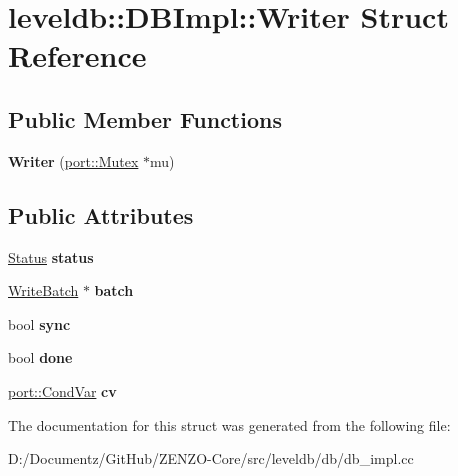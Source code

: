 \hypertarget{structleveldb_1_1_d_b_impl_1_1_writer}{}\section{leveldb\+::D\+B\+Impl\+::Writer Struct Reference}
\label{structleveldb_1_1_d_b_impl_1_1_writer}
\subsection*{Public Member Functions}
\begin{DoxyCompactItemize}
\item 
\mbox{\label{structleveldb_1_1_d_b_impl_1_1_writer_a7dfb43a804e1ded7a2a85b3bc756ea93}} 
{\bfseries Writer} (\mbox{\hyperlink{classleveldb_1_1port_1_1_mutex}{port\+::\+Mutex}} $\ast$mu)
\end{DoxyCompactItemize}
\subsection*{Public Attributes}
\begin{DoxyCompactItemize}
\item 
\mbox{\label{structleveldb_1_1_d_b_impl_1_1_writer_af3b0436a99d2679c0e0ac9f6e1fefa37}} 
\mbox{\hyperlink{classleveldb_1_1_status}{Status}} {\bfseries status}
\item 
\mbox{\label{structleveldb_1_1_d_b_impl_1_1_writer_ada051134318411635892f0a7d17cb7c0}} 
\mbox{\hyperlink{classleveldb_1_1_write_batch}{Write\+Batch}} $\ast$ {\bfseries batch}
\item 
\mbox{\label{structleveldb_1_1_d_b_impl_1_1_writer_acb39717e1fa61127f262b474e18ec9f6}} 
bool {\bfseries sync}
\item 
\mbox{\label{structleveldb_1_1_d_b_impl_1_1_writer_afc6025afd873f82252cb563687bd3106}} 
bool {\bfseries done}
\item 
\mbox{\label{structleveldb_1_1_d_b_impl_1_1_writer_aacb835eedc44855a7c223fca024c5ac4}} 
\mbox{\hyperlink{classleveldb_1_1port_1_1_cond_var}{port\+::\+Cond\+Var}} {\bfseries cv}
\end{DoxyCompactItemize}


The documentation for this struct was generated from the following file\+:\begin{DoxyCompactItemize}
\item 
D\+:/\+Documentz/\+Git\+Hub/\+Z\+E\+N\+Z\+O-\/\+Core/src/leveldb/db/db\+\_\+impl.\+cc\end{DoxyCompactItemize}
